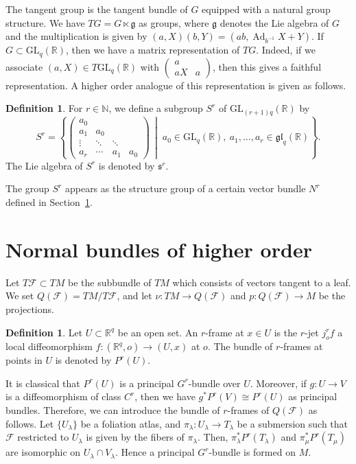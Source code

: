 \documentclass[12pt]{amsart}
\newcommand{\CF}{{\mathcal F}}
\newcommand{\R}{{\mathbb R}}
\newcommand{\N}{{\mathbb N}}
\newcommand{\gl}{\mathfrak{gl}}
\newcommand{\GL}{\mathrm{GL}}
\DeclareMathOperator{\Ad}{\mathrm{Ad}}
\theoremstyle{definition}
\newtheorem{definition}[theorem]{Definition}
\theoremstyle{remark}
\begin{document}
The tangent group is the tangent bundle of $G$ equipped with a natural group structure.
We have $TG=G\ltimes\mathfrak{g}$ as groups, where $\mathfrak{g}$ denotes the Lie algebra of $G$ and the multiplication is given by $(a,X)(b,Y)=(ab,\Ad_{b^{-1}}X+Y)$.
If $G\subset\GL_q(\R)$, then we have a matrix representation of $TG$.
Indeed, if we associate $(a,X)\in T\GL_q(\R)$ with $\begin{pmatrix}
a\\
aX & a
\end{pmatrix}$, then this gives a faithful representation.
A higher order analogue of this representation is given as follows.

\begin{definition}
For $r\in\N$, we define a subgroup $S^r$ of $\GL_{(r+1)q}(\R)$ by
\[
S^r=\left\{%
\begin{pmatrix}
a_0\\
a_1 & a_0\\
\vdots & \ddots & \ddots\\
a_r & \cdots & a_1 & a_0
\end{pmatrix}\,\middle|\;a_0\in\GL_q(\R),\ a_1,\ldots,a_r\in\gl_q(\R)\right\}.
\]
The Lie algebra of $S^r$ is denoted by $\mathfrak{s}^r$.
\end{definition}

The group $S^r$ appears as the structure group of a certain vector bundle $N^r$ defined in Section~\ref{sec2}.

\section{Normal bundles of higher order}
\label{sec2}
Let $T\CF\subset TM$ be the subbundle of $TM$ which consists of vectors tangent to a leaf.
We set $Q(\CF)=TM/T\CF$, and let $\nu\colon TM\to Q(\CF)$ and $p\colon Q(\CF)\to M$ be the projections.


\begin{definition}
Let $U\subset\R^q$ be an open set.
An $r$-frame at $x\in U$ is the $r$-jet $j^r_of$ a local diffeomorphism $f\colon(\R^q,o)\to(U,x)$ at $o$.
The bundle of $r$-frames at points in $U$ is denoted by $P^r(U)$.
\end{definition}

It is classical that $P^r(U)$ is a principal $G^r$-bundle over $U$.
Moreover, if $g\colon U\to V$ is a diffeomorphism of class $C^r$, then we have $g^*P^r(V)\cong P^r(U)$ as principal bundles.
Therefore, we can introduce the bundle of $r$-frames of $Q(\CF)$ as follows.
Let $\{U_\lambda\}$ be a foliation atlas, and $\pi_\lambda\colon U_\lambda\to T_\lambda$ be a submersion such that $\CF$ restricted to $U_\lambda$ is given by the fibers of $\pi_\lambda$.
Then, $\pi_\lambda^*P^r(T_\lambda)$ and $\pi_\mu^*P^r(T_\mu)$ are isomorphic on $U_\lambda\cap V_\lambda$.
Hence a principal $G^r$-bundle is formed on $M$.
\end{document}
